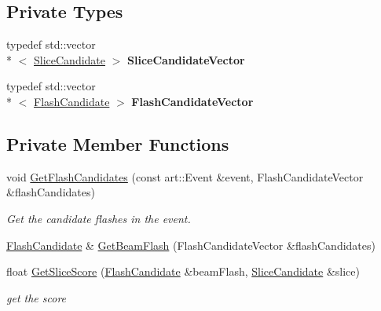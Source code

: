 \subsection*{Private Types}
\begin{DoxyCompactItemize}
\item 
\hypertarget{classflashmatch_1_1FlashMatchingTool_a6a9ab4e3315550624ddc72103c2d260c}{typedef std\-::vector\\*
$<$ \hyperlink{classflashmatch_1_1FlashMatchingTool_1_1SliceCandidate}{Slice\-Candidate} $>$ {\bfseries Slice\-Candidate\-Vector}}\label{classflashmatch_1_1FlashMatchingTool_a6a9ab4e3315550624ddc72103c2d260c}

\item 
\hypertarget{classflashmatch_1_1FlashMatchingTool_ae4ca02d264c29ff19c6d32627c4bf852}{typedef std\-::vector\\*
$<$ \hyperlink{classflashmatch_1_1FlashMatchingTool_1_1FlashCandidate}{Flash\-Candidate} $>$ {\bfseries Flash\-Candidate\-Vector}}\label{classflashmatch_1_1FlashMatchingTool_ae4ca02d264c29ff19c6d32627c4bf852}

\end{DoxyCompactItemize}
\subsection*{Private Member Functions}
\begin{DoxyCompactItemize}
\item 
void \hyperlink{classflashmatch_1_1FlashMatchingTool_a68229bfc94d94e91513fefe60a3b43d6}{Get\-Flash\-Candidates} (const art\-::\-Event \&event, Flash\-Candidate\-Vector \&flash\-Candidates)
\begin{DoxyCompactList}\small\item\em Get the candidate flashes in the event. \end{DoxyCompactList}\item 
\hyperlink{classflashmatch_1_1FlashMatchingTool_1_1FlashCandidate}{Flash\-Candidate} \& \hyperlink{classflashmatch_1_1FlashMatchingTool_a55eb0441a37240344fc893857aabda28}{Get\-Beam\-Flash} (Flash\-Candidate\-Vector \&flash\-Candidates)
\item 
float \hyperlink{classflashmatch_1_1FlashMatchingTool_a64dcefa0f3f8e95d51dcb0aadbc711c8}{Get\-Slice\-Score} (\hyperlink{classflashmatch_1_1FlashMatchingTool_1_1FlashCandidate}{Flash\-Candidate} \&beam\-Flash, \hyperlink{classflashmatch_1_1FlashMatchingTool_1_1SliceCandidate}{Slice\-Candidate} \&slice)
\begin{DoxyCompactList}\small\item\em get the score \end{DoxyCompactList}\end{DoxyCompactItemize}
